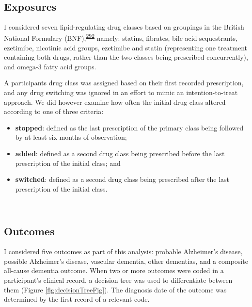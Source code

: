 \documentclass[a4paper, twoside]{templates/ociamthesis}
\providecommand{\tightlist}{%
  \setlength{\itemsep}{0pt}\setlength{\parskip}{0pt}}
\begin{document}
~

\hypertarget{exposures}{%
\subsection{Exposures}\label{exposures}}

I considered seven lipid-regulating drug classes based on groupings in the British National Formulary (BNF),\textsuperscript{\protect\hyperlink{ref-wishart2017}{292}} namely: statins, fibrates, bile acid sequestrants, ezetimibe, nicotinic acid groups, ezetimibe and statin (representing one treatment containing both drugs, rather than the two classes being prescribed concurrently), and omega-3 fatty acid groups.

A participants drug class was assigned based on their first recorded prescription, and any drug switching was ignored in an effort to mimic an intention-to-treat approach. We did however examine how often the initial drug class altered according to one of three criteria:

\begin{itemize}
\tightlist
\item
  \textbf{stopped}: defined as the last prescription of the primary class being followed by at least six months of observation;
\item
  \textbf{added}: defined as a second drug class being prescribed before the last prescription of the initial class; and
\item
  \textbf{switched}: defined as a second drug class being prescribed after the last prescription of the initial class.
\end{itemize}

~

\hypertarget{cprd-outcomes}{%
\subsection{Outcomes}\label{cprd-outcomes}}

I considered five outcomes as part of this analysis: probable Alzheimer's disease, possible Alzheimer's disease, vascular dementia, other dementias, and a composite all-cause dementia outcome. When two or more outcomes were coded in a participant's clinical record, a decision tree was used to differentiate between them (Figure \ref{fig:decisionTreeFig}). The diagnosis date of the outcome was determined by the first record of a relevant code.
\end{document}
